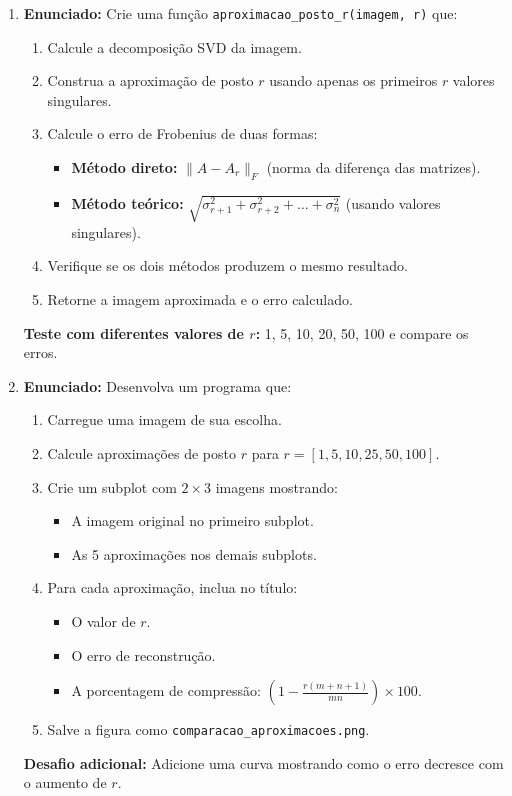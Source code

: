 \documentclass[a4paper,12pt]{article}
\begin{document}
\begin{enumerate}
    \item \textbf{Enunciado:}
    Crie uma função \texttt{aproximacao\_posto\_r(imagem, r)} que:
    \begin{enumerate}
        \item Calcule a decomposição SVD da imagem.
        \item Construa a aproximação de posto $r$ usando apenas os primeiros $r$ valores singulares.
        \item Calcule o erro de Frobenius de duas formas:
        \begin{itemize}
            \item \textbf{Método direto:} $\|A - A_r\|_F$ (norma da diferença das matrizes).
            \item \textbf{Método teórico:} $\sqrt{\sigma_{r+1}^2 + \sigma_{r+2}^2 + \dots + \sigma_n^2}$ (usando valores singulares).
        \end{itemize}
        \item Verifique se os dois métodos produzem o mesmo resultado.
        \item Retorne a imagem aproximada e o erro calculado.
    \end{enumerate}
    \textbf{Teste com diferentes valores de $r$:} 1, 5, 10, 20, 50, 100 e compare os erros.

    \item \textbf{Enunciado:}
    Desenvolva um programa que:
    \begin{enumerate}
        \item Carregue uma imagem de sua escolha.
        \item Calcule aproximações de posto $r$ para $r = [1, 5, 10, 25, 50, 100]$.
        \item Crie um subplot com $2 \times 3$ imagens mostrando:
        \begin{itemize}
            \item A imagem original no primeiro subplot.
            \item As 5 aproximações nos demais subplots.
        \end{itemize}
        \item Para cada aproximação, inclua no título:
        \begin{itemize}
            \item O valor de $r$.
            \item O erro de reconstrução.
            \item A porcentagem de compressão: $\left(1 - \frac{r(m+n+1)}{mn}\right) \times 100$.
        \end{itemize}
        \item Salve a figura como \texttt{comparacao\_aproximacoes.png}.
    \end{enumerate}
    \textbf{Desafio adicional:} Adicione uma curva mostrando como o erro decresce com o aumento de $r$.


\end{enumerate}
\end{document}
